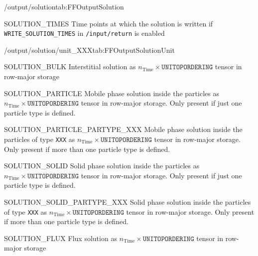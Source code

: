\begin{groupscope}{/output/solution}{tab:FFOutputSolution}
  \begin{dataset}[type=double,unit={\si{\second}}]{SOLUTION\_TIMES}
    Time points at which the solution is written if \texttt{WRITE\_SOLUTION\_TIMES} in \texttt{/input/return} is enabled
  \end{dataset}
\end{groupscope}

\begin{groupscope}{/output/solution/unit\_XXX}{tab:FFOutputSolutionUnit}
  \begin{dataset}[type=double,unit={\si{\mol\per\cubic\metre\of{IV}}}]{SOLUTION\_BULK}
    Interstitial solution as $n_{\text{Time}} \times \texttt{UNITOPORDERING}$ tensor in row-major storage
  \end{dataset}
  \begin{dataset}[type=double,unit={\si{\mol\per\cubic\metre\of{MP}}}]{SOLUTION\_PARTICLE}
    Mobile phase solution inside the particles as $n_{\text{Time}} \times \texttt{UNITOPORDERING}$ tensor in row-major storage.
    Only present if just one particle type is defined.
  \end{dataset}
  \begin{dataset}[type=double,unit={\si{\mol\per\cubic\metre\of{MP}}}]{SOLUTION\_PARTICLE\_PARTYPE\_XXX}
    Mobile phase solution inside the particles of type \texttt{XXX} as $n_{\text{Time}} \times \texttt{UNITOPORDERING}$ tensor in row-major storage.
    Only present if more than one particle type is defined.
  \end{dataset}
  \begin{dataset}[type=double,unit={\si{\mol\per\cubic\metre\of{MP}}}]{SOLUTION\_SOLID}
    Solid phase solution inside the particles as $n_{\text{Time}} \times \texttt{UNITOPORDERING}$ tensor in row-major storage.
    Only present if just one particle type is defined.
  \end{dataset}
  \begin{dataset}[type=double,unit={\si{\mol\per\cubic\metre\of{SP}}}]{SOLUTION\_SOLID\_PARTYPE\_XXX}
    Solid phase solution inside the particles of type \texttt{XXX} as $n_{\text{Time}} \times \texttt{UNITOPORDERING}$ tensor in row-major storage.
    Only present if more than one particle type is defined.
  \end{dataset}
  \begin{dataset}[type=double,unit={\si{\mol\per\square\metre\per\second}}]{SOLUTION\_FLUX}
    Flux solution as $n_{\text{Time}} \times \texttt{UNITOPORDERING}$ tensor in row-major storage

\end{dataset}
\end{groupscope}
